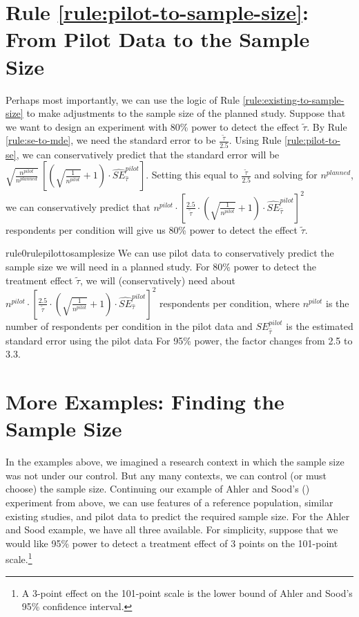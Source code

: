 \documentclass[12pt]{article}
\begin{document}
\section*{Rule \ref{rule:pilot-to-sample-size}: From Pilot Data to the Sample Size}

Perhaps most importantly, we can use the logic of Rule \ref{rule:existing-to-sample-size} to make adjustments to the sample size of the planned study. 
Suppose that we want to design an experiment with 80\% power to detect the effect $\widetilde{\tau}$. 
By Rule \ref{rule:se-to-mde}, we need the standard error to be $\frac{\widetilde{\tau}}{2.5}$. 
Using Rule \ref{rule:pilot-to-se}, we can conservatively predict that the standard error will be $\sqrt{\frac{n^{pilot}}{n^{planned}}}\ \left\lbrack \left( \sqrt{\frac{1}{n^{pilot}}} + 1 \right) \cdot {\widehat{SE}}_{\widehat{\tau}}^{pilot} \right\rbrack$.
Setting this equal to $\frac{\widetilde{\tau}}{2.5}$ and solving for $n^{planned}$, we can conservatively predict that $n^{pilot} \cdot \left\lbrack \frac{2.5}{\widetilde{\tau}} \cdot \left( \sqrt{\frac{1}{n^{pilot}}} + 1 \right) \cdot {\widehat{SE}}_{\widehat{\tau}}^{pilot} \right\rbrack^{2}$ respondents per condition will give us 80\% power to detect the effect $\widetilde{\tau}$.

\begin{restatable}{rule0}{rulepilottosamplesize}
\label{rule:pilot-to-sample-size}
We can use pilot data to conservatively predict the sample size we will need in a planned study. 
For 80\% power to detect the treatment effect $\widetilde{\tau}$, we will (conservatively) need about $n^{pilot} \cdot \left\lbrack \frac{2.5}{\widetilde{\tau}} \cdot \left( \sqrt{\frac{1}{n^{pilot}}} + 1 \right) \cdot {\widehat{SE}}_{\widehat{\tau}}^{pilot} \right\rbrack^{2}$ respondents per condition, where $n^{pilot}$ is the number of respondents per condition in the pilot data and $SE_{\widehat{\tau}}^{pilot}$ is the estimated standard error using the pilot data
For 95\% power, the factor changes from 2.5 to 3.3.
\end{restatable}

\section*{More Examples: Finding the Sample Size}

In the examples above, we imagined a research context in which the sample size was not under our control. 
But any many contexts, we can control (or must choose) the sample size. 
Continuing our example of Ahler and Sood's (\citeyear{Ahler2018}) experiment from above, we can use features of a reference population, similar existing studies, and pilot data to predict the required sample size. 
For the Ahler and Sood example, we have all three available. 
For simplicity, suppose that we would like 95\% power to detect a treatment effect of 3 points on the 101-point scale.\footnote{A 3-point effect on the 101-point scale is the lower bound of Ahler and Sood's 95\% confidence interval.}
\end{document}
